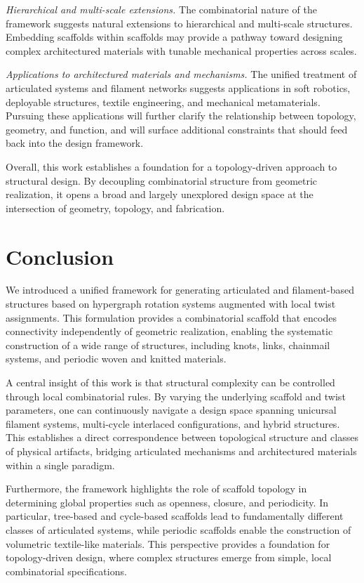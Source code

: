 \documentclass[acmtog]{acmart}
\begin{document}
\textit{Hierarchical and multi-scale extensions.} The combinatorial nature of the framework suggests natural extensions to hierarchical and multi-scale structures. Embedding scaffolds within scaffolds may provide a pathway toward designing complex architectured materials with tunable mechanical properties across scales.

\textit{Applications to architectured materials and mechanisms.} The unified treatment of articulated systems and filament networks suggests applications in soft robotics, deployable structures, textile engineering, and mechanical metamaterials. Pursuing these applications will further clarify the relationship between topology, geometry, and function, and will surface additional constraints that should feed back into the design framework.

\medskip

Overall, this work establishes a foundation for a topology-driven approach to structural design. By decoupling combinatorial structure from geometric realization, it opens a broad and largely unexplored design space at the intersection of geometry, topology, and fabrication.


\section{Conclusion}


We introduced a unified framework for generating articulated and filament-based structures based on hypergraph rotation systems augmented with local twist assignments. This formulation provides a combinatorial scaffold that encodes connectivity independently of geometric realization, enabling the systematic construction of a wide range of structures, including knots, links, chainmail systems, and periodic woven and knitted materials.

A central insight of this work is that structural complexity can be controlled through local combinatorial rules. By varying the underlying scaffold and twist parameters, one can continuously navigate a design space spanning unicursal filament systems, multi-cycle interlaced configurations, and hybrid structures. This establishes a direct correspondence between topological structure and classes of physical artifacts, bridging articulated mechanisms and architectured materials within a single paradigm.

Furthermore, the framework highlights the role of scaffold topology in determining global properties such as openness, closure, and periodicity. In particular, tree-based and cycle-based scaffolds lead to fundamentally different classes of articulated systems, while periodic scaffolds enable the construction of volumetric textile-like materials. This perspective provides a foundation for topology-driven design, where complex structures emerge from simple, local combinatorial specifications.
\end{document}
